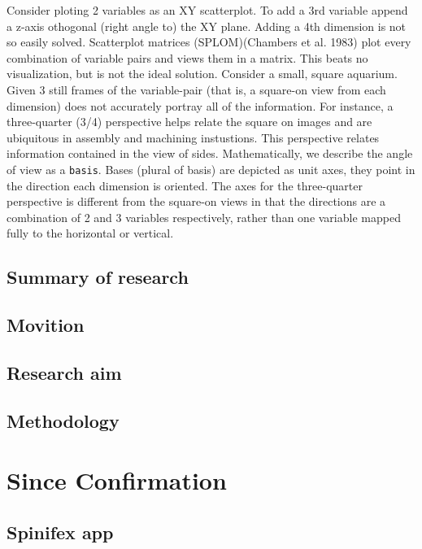 \documentclass[11,]{article}
\begin{document}
Consider ploting 2 variables as an XY scatterplot. To add a 3rd variable append a z-axis othogonal (right angle to) the XY plane. Adding a 4th dimension is not so easily solved. Scatterplot matrices (SPLOM)(Chambers et al. 1983) plot every combination of variable pairs and views them in a matrix. This beats no visualization, but is not the ideal solution. Consider a small, square aquarium. Given 3 still frames of the variable-pair (that is, a square-on view from each dimension) does not accurately portray all of the information. For instance, a three-quarter (3/4) perspective helps relate the square on images and are ubiquitous in assembly and machining instustions. This perspective relates information contained in the view of sides. Mathematically, we describe the angle of view as a \texttt{basis}. Bases (plural of basis) are depicted as unit axes, they point in the direction each dimension is oriented. The axes for the three-quarter perspective is different from the square-on views in that the directions are a combination of 2 and 3 variables respectively, rather than one variable mapped fully to the horizontal or vertical.

\hypertarget{summary-of-research}{%
\subsection{Summary of research}\label{summary-of-research}}

\hypertarget{movition}{%
\subsection{Movition}\label{movition}}

\hypertarget{research-aim}{%
\subsection{Research aim}\label{research-aim}}

\hypertarget{methodology}{%
\subsection{Methodology}\label{methodology}}

\hypertarget{since-confirmation}{%
\section{Since Confirmation}\label{since-confirmation}}

\hypertarget{spinifex-app}{%
\subsection{Spinifex app}\label{spinifex-app}}
\end{document}
